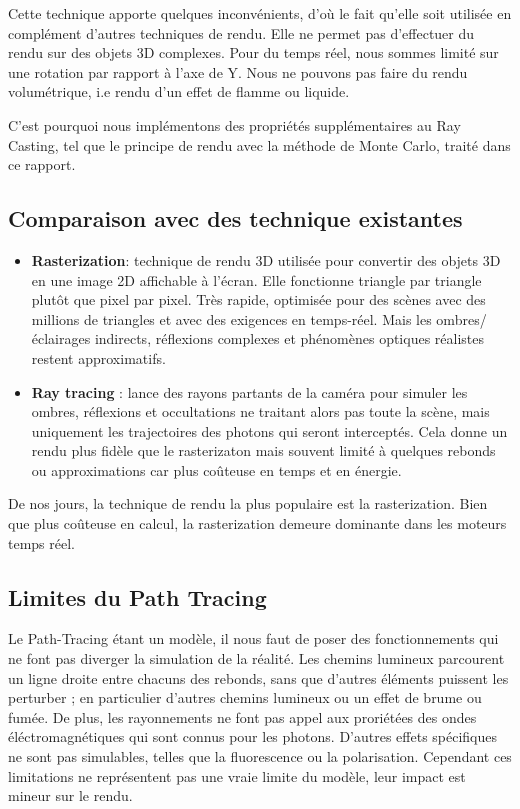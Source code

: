 Cette technique apporte quelques inconvénients, d'où le fait qu'elle soit utilisée en complément d'autres techniques de rendu. Elle ne permet pas d'effectuer du rendu sur des objets 3D complexes. Pour du temps réel, nous sommes limité sur une rotation par rapport à l'axe de Y. Nous ne pouvons pas faire du rendu volumétrique, i.e rendu d'un effet de flamme ou liquide.

C'est pourquoi nous implémentons des propriétés supplémentaires au Ray Casting, tel que le principe de rendu avec la méthode de Monte Carlo, traité dans ce rapport.

\subsection{Comparaison avec des technique existantes}


\begin{itemize}
\item[$\bullet$]\textbf{Rasterization}: technique de rendu 3D utilisée pour convertir des objets 3D en une image 2D affichable à l'écran. Elle fonctionne triangle par triangle plutôt que pixel par pixel. Très rapide, optimisée pour des scènes avec des millions de triangles et avec des exigences en temps-réel. Mais les ombres/éclairages indirects, réflexions complexes et phénomènes optiques réalistes restent approximatifs. 

\item[$\bullet$] \textbf{Ray tracing }: lance des rayons partants de la caméra pour simuler les ombres, réflexions et occultations ne traitant alors pas toute la scène, mais uniquement les trajectoires des photons qui seront interceptés. Cela donne un rendu plus fidèle que le rasterizaton mais souvent limité à quelques rebonds ou approximations car plus coûteuse en temps et en énergie.

\end{itemize}

De nos jours, la technique de rendu la plus populaire est la rasterization. Bien que plus coûteuse en calcul, la rasterization demeure dominante dans les moteurs temps réel.

\subsection{Limites du Path Tracing}

Le Path-Tracing étant un modèle, il nous faut de poser des fonctionnements qui ne font pas diverger la simulation de la réalité. Les chemins lumineux parcourent un ligne droite entre chacuns des rebonds, sans que d'autres éléments puissent les perturber ; en particulier d'autres chemins lumineux ou un effet de brume ou fumée. De plus, les rayonnements ne font pas appel aux proriétées des ondes éléctromagnétiques qui sont connus pour les photons. D'autres effets spécifiques ne sont pas simulables, telles que la fluorescence ou la polarisation. Cependant ces limitations ne représentent pas une vraie limite du modèle, leur impact est mineur sur le rendu.

